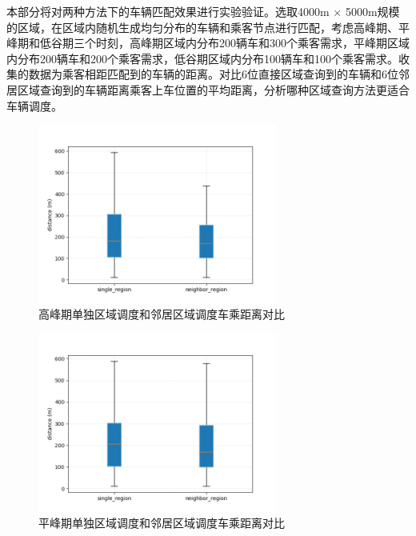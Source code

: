 本部分将对两种方法下的车辆匹配效果进行实验验证。选取4000m × 5000m规模的区域，在区域内随机生成均匀分布的车辆和乘客节点进行匹配，考虑高峰期、平峰期和低谷期三个时刻，高峰期区域内分布200辆车和300个乘客需求，平峰期区域内分布200辆车和200个乘客需求，低谷期区域内分布100辆车和100个乘客需求。收集的数据为乘客相距匹配到的车辆的距离。对比6位直接区域查询到的车辆和6位邻居区域查询到的车辆距离乘客上车位置的平均距离，分析哪种区域查询方法更适合车辆调度。

\begin{figure}[h]
  \centering
  \includegraphics[height=0.3\textheight,width=0.7\textwidth]{figures/高峰车乘匹配}
  \caption{高峰期单独区域调度和邻居区域调度车乘距离对比}\label{fig:highRegionDistance}
\end{figure}

\begin{figure}[h]
  \centering
  \includegraphics[height=0.3\textheight,width=0.7\textwidth]{figures/平峰车乘匹配}
  \caption{平峰期单独区域调度和邻居区域调度车乘距离对比}\label{fig:pingRegionDistance}
\end{figure}

